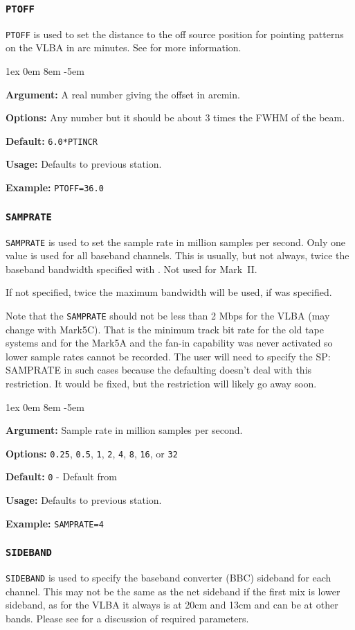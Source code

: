 \documentclass{report}
\newcommand{\rcwbox}[5]{
  \begin{list}{}{\parsep 1ex  \itemsep 0em
                 \leftmargin 8em  \itemindent -5em }
    \item {\bf Argument:} #1
    \item {\bf Options:}  #2
    \item {\bf Default:}  #3
    \item {\bf Usage:}    #4
    \item {\bf Example:}  #5
  \end{list}
}
\begin{document}
\subsubsection{\label{SP:PTOFF}{\tt PTOFF}}

{\tt PTOFF} is used to set the distance to the off source position
for pointing patterns on the
VLBA in arc minutes. See  for more
information.

\rcwbox
{A real number giving the offset in arcmin.}
{Any number but it should be about 3 times the FWHM of the beam.}
{{\tt 6.0*PTINCR}}
{Defaults to previous station.}
{{\tt PTOFF=36.0}}


\subsubsection{\label{SP:SAMPRATE}{\tt SAMPRATE}}

{\tt SAMPRATE} is used to set the sample rate in million samples per
second.  Only one value is used for all baseband channels. This is
usually, but not always, twice the baseband bandwidth specified with
. Not used for Mark~II.

If not specified, twice the maximum bandwidth will be used, if
 was specified.

Note that the {\tt SAMPRATE} should not be less than 2 Mbps for the
VLBA (may change with Mark5C).  That is the minimum track bit rate for
the old tape systems and for the Mark5A and the fan-in capability was
never activated so lower sample rates cannot be recorded.  The user
will need to specify the {SP: SAMPRATE} in such cases because the
defaulting doesn't deal with this restriction.  It would be fixed, but
the restriction will likely go away soon.

\rcwbox
{Sample rate in million samples per second.}
{{\tt 0.25}, {\tt 0.5}, {\tt 1}, {\tt 2}, {\tt 4}, {\tt 8}, {\tt 16},
or {\tt 32}}
{{\tt 0} - Default from \htmlref{{\tt BBFILTER}}{SP:BBFILTER} }
{Defaults to previous station.}
{{\tt SAMPRATE=4}}


\subsubsection{\label{SP:SIDEBAND}{\tt SIDEBAND}}

{\tt SIDEBAND} is used to specify the baseband converter (BBC)
sideband for each channel.  This may not be the same as the net
sideband if the first mix is lower sideband, as for the VLBA it always
is at 20cm and 13cm and can be at other bands. Please see
 for a discussion of required
parameters.
\end{document}
